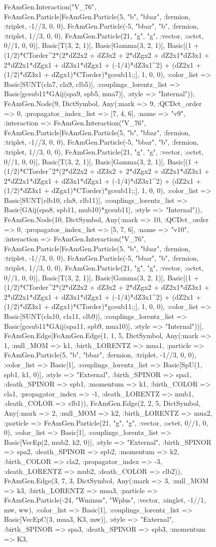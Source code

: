\documentclass{revtex4}
\begin{document}
\begin{figure}[!htb]
\begin{center}
{FeAmGen.Interaction("V_76", FeAmGen.Particle[FeAmGen.Particle(5, "b", "bbar", :fermion, :triplet, -1//3, 0, 0), FeAmGen.Particle(-5, "bbar", "b", :fermion, :triplet, 1//3, 0, 0), FeAmGen.Particle(21, "g", "g", :vector, :octet, 0//1, 0, 0)], Basic[T(3, 2, 1)], Basic[Gamma(3, 2, 1)], Basic[(1 + (1/2)*CTorder^2*(2*dZ2x2 + dZ3x2 + 2*dZgx2 + dZ2x1*dZ3x1 + 2*dZ2x1*dZgx1 + dZ3x1*dZgx1 + (-1/4)*dZ3x1^2) + (dZ2x1 + (1/2)*dZ3x1 + dZgx1)*CTorder)*gcsub11;;], 1, 0, 0), :color_list => Basic[SUNT(cla7, cla9, clb5)], :couplings_lorentz_list => Basic[gcsub11*GAij(spa9, spb5, mua7)], :style => "Internal")), FeAmGen.Node(9, Dict{Symbol, Any}(:mark => 9, :QCDct_order => 0, :propagator_index_list => [7, 4, 6], :name => "v9", :interaction => FeAmGen.Interaction("V_76", FeAmGen.Particle[FeAmGen.Particle(5, "b", "bbar", :fermion, :triplet, -1//3, 0, 0), FeAmGen.Particle(-5, "bbar", "b", :fermion, :triplet, 1//3, 0, 0), FeAmGen.Particle(21, "g", "g", :vector, :octet, 0//1, 0, 0)], Basic[T(3, 2, 1)], Basic[Gamma(3, 2, 1)], Basic[(1 + (1/2)*CTorder^2*(2*dZ2x2 + dZ3x2 + 2*dZgx2 + dZ2x1*dZ3x1 + 2*dZ2x1*dZgx1 + dZ3x1*dZgx1 + (-1/4)*dZ3x1^2) + (dZ2x1 + (1/2)*dZ3x1 + dZgx1)*CTorder)*gcsub11;;], 1, 0, 0), :color_list => Basic[SUNT(clb10, cla8, clb11)], :couplings_lorentz_list => Basic[GAij(spa8, spb11, mub10)*gcsub11], :style => "Internal")), FeAmGen.Node(10, Dict{Symbol, Any}(:mark => 10, :QCDct_order => 0, :propagator_index_list => [5, 7, 6], :name => "v10", :interaction => FeAmGen.Interaction("V_76", FeAmGen.Particle[FeAmGen.Particle(5, "b", "bbar", :fermion, :triplet, -1//3, 0, 0), FeAmGen.Particle(-5, "bbar", "b", :fermion, :triplet, 1//3, 0, 0), FeAmGen.Particle(21, "g", "g", :vector, :octet, 0//1, 0, 0)], Basic[T(3, 2, 1)], Basic[Gamma(3, 2, 1)], Basic[(1 + (1/2)*CTorder^2*(2*dZ2x2 + dZ3x2 + 2*dZgx2 + dZ2x1*dZ3x1 + 2*dZ2x1*dZgx1 + dZ3x1*dZgx1 + (-1/4)*dZ3x1^2) + (dZ2x1 + (1/2)*dZ3x1 + dZgx1)*CTorder)*gcsub11;;], 1, 0, 0), :color_list => Basic[SUNT(cla10, cla11, clb9)], :couplings_lorentz_list => Basic[gcsub11*GAij(spa11, spb9, mua10)], :style => "Internal"))], FeAmGen.Edge[FeAmGen.Edge(1, 1, 5, Dict{Symbol, Any}(:mark => 1, :null_MOM => k1, :birth_LORENTZ => mua1, :particle => FeAmGen.Particle(5, "b", "bbar", :fermion, :triplet, -1//3, 0, 0), :color_list => Basic[1], :couplings_lorentz_list => Basic[SpU(1, spb1, k1, 0)], :style => "External", :birth_SPINOR => spa1, :death_SPINOR => spb1, :momentum => k1, :birth_COLOR => cla1, :propagator_index => -1, :death_LORENTZ => mub1, :death_COLOR => clb1)), FeAmGen.Edge(2, 2, 5, Dict{Symbol, Any}(:mark => 2, :null_MOM => k2, :birth_LORENTZ => mua2, :particle => FeAmGen.Particle(21, "g", "g", :vector, :octet, 0//1, 0, 0), :color_list => Basic[1], :couplings_lorentz_list => Basic[VecEp(2, mub2, k2, 0)], :style => "External", :birth_SPINOR => spa2, :death_SPINOR => spb2, :momentum => k2, :birth_COLOR => cla2, :propagator_index => -3, :death_LORENTZ => mub2, :death_COLOR => clb2)), FeAmGen.Edge(3, 7, 3, Dict{Symbol, Any}(:mark => 3, :null_MOM => k3, :birth_LORENTZ => mua3, :particle => FeAmGen.Particle(-24, "Wminus", "Wplus", :vector, :singlet, -1//1, mw, ww), :color_list => Basic[1], :couplings_lorentz_list => Basic[VecEpC(3, mua3, K3, mw)], :style => "External", :birth_SPINOR => spa3, :death_SPINOR => spb3, :momentum => K3, }
\end{center}
\end{figure}
\end{document}

